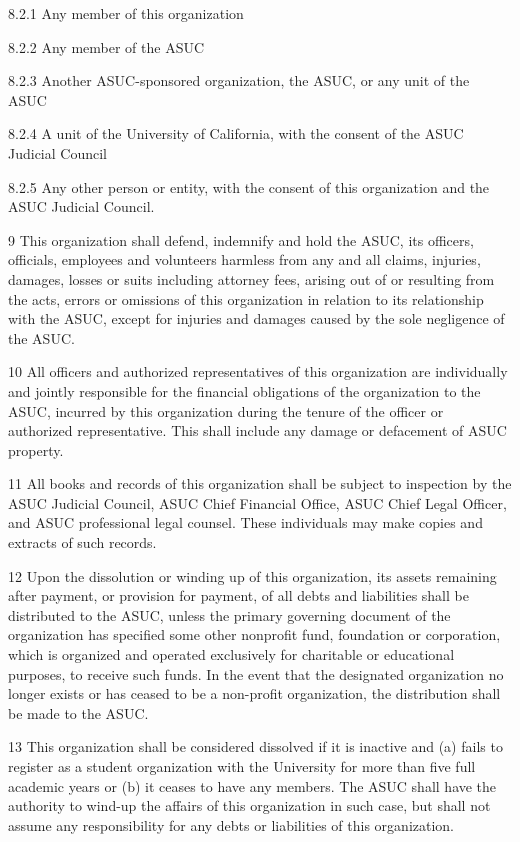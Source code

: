 \documentclass[11pt]{article}
\begin{document}
8.2.1 Any member of this organization

8.2.2 Any member of the ASUC

8.2.3 Another ASUC-sponsored organization, the ASUC, or any unit of the ASUC

8.2.4 A unit of the University of California, with the consent of the ASUC Judicial Council

8.2.5 Any other person or entity, with the consent of this organization and the ASUC Judicial Council.

9 This organization shall defend, indemnify and hold the ASUC, its officers, officials, employees and volunteers harmless from any and all claims, injuries, damages, losses or suits including attorney fees, arising out of or resulting from the acts, errors or omissions of this organization in relation to its relationship with the ASUC, except for injuries and damages caused by the sole negligence of the ASUC.

10 All officers and authorized representatives of this organization are individually and jointly responsible for the financial obligations of the organization to the ASUC, incurred by this organization during the tenure of the officer or authorized representative.
This shall include any damage or defacement of ASUC property.

11 All books and records of this organization shall be subject to inspection by the ASUC Judicial Council, ASUC Chief Financial Office, ASUC Chief Legal Officer, and ASUC professional legal counsel.
These individuals may make copies and extracts of such records.

12 Upon the dissolution or winding up of this organization, its assets remaining after payment, or provision for payment, of all debts and liabilities shall be distributed to the ASUC, unless the primary governing document of the organization has specified some other nonprofit fund, foundation or corporation, which is organized and operated exclusively for charitable or educational purposes, to receive such funds.
In the event that the designated organization no longer exists or has ceased to be a non-profit organization, the distribution shall be made to the ASUC.

13 This organization shall be considered dissolved if it is inactive and (a) fails to register as a student organization with the University for more than five full academic years or (b) it ceases to have any members.
The ASUC shall have the authority to wind-up the affairs of this organization in such case, but shall not assume any responsibility for any debts or liabilities of this organization.
\end{document}
